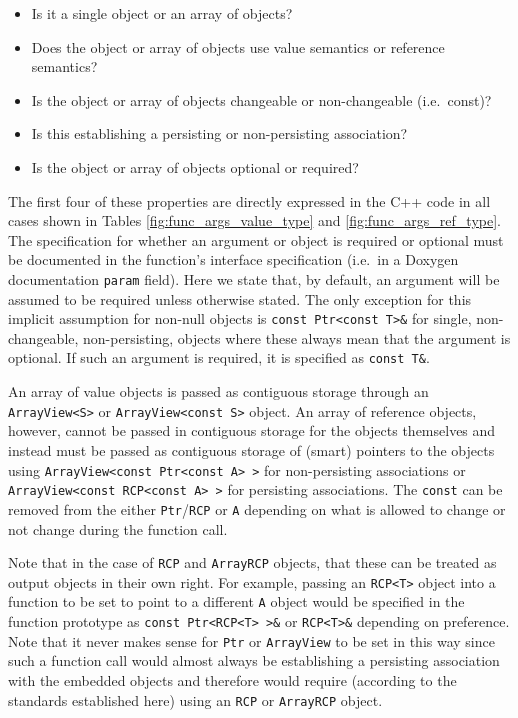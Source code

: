 \documentclass[pdf,ps2pdf,11pt]{SANDreport}
\begin{document}
\begin{itemize}

{}\item Is it a single object or an array of objects?

{}\item Does the object or array of objects use value semantics or
reference semantics?

{}\item Is the object or array of objects changeable or non-changeable
(i.e.\ const)?

{}\item Is this establishing a persisting or non-persisting association?

{}\item Is the object or array of objects optional or required?

\end{itemize}

The first four of these properties are directly expressed in the C++
code in all cases shown in Tables {}\ref{fig:func_args_value_type} and
{}\ref{fig:func_args_ref_type}.  The specification for whether an
argument or object is required or optional must be documented in the
function's interface specification (i.e.\ in a Doxygen documentation
{}\texttt{param} field).  Here we state that, by default, an argument
will be assumed to be required unless otherwise stated.  The only
exception for this implicit assumption for non-null objects is
{}\texttt{const Ptr<const T>\&} for single, non-changeable,
non-persisting, objects where these always mean that the argument is
optional.  If such an argument is required, it is specified as
{}\texttt{const T\&}.

An array of value objects is passed as contiguous storage through an
{}\texttt{ArrayView<S>} or {}\texttt{ArrayView<const S>} object.  An
array of reference objects, however, cannot be passed in contiguous
storage for the objects themselves and instead must be passed as
contiguous storage of (smart) pointers to the objects using
{}\texttt{ArrayView<const Ptr<const A> >} for non-persisting
associations or {}\texttt{ArrayView<const RCP<const A> >} for
persisting associations.  The {}\texttt{const} can be removed from the
either {}\texttt{Ptr}/{}\texttt{RCP} or {}\texttt{A} depending on what
is allowed to change or not change during the function call.

Note that in the case of {}\texttt{RCP} and {}\texttt{ArrayRCP}
objects, that these can be treated as output objects in their own
right.  For example, passing an {}\texttt{RCP<T>} object into a
function to be set to point to a different {}\texttt{A} object would
be specified in the function prototype as {}\texttt{const Ptr<RCP<T>
>\&} or {}\texttt{RCP<T>\&} depending on preference.  Note that it
never makes sense for {}\texttt{Ptr} or {}\texttt{ArrayView} to be set
in this way since such a function call would almost always be
establishing a persisting association with the embedded objects and
therefore would require (according to the standards established here)
using an {}\texttt{RCP} or {}\texttt{ArrayRCP} object.
\end{document}
